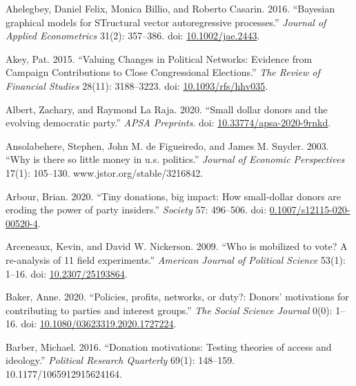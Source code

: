 \documentclass[12pt,]{article}
\newlength{\cslhangindent}
\newenvironment{CSLReferences}%
    {\setlength{\parindent}{0pt}%
    \everypar{\setlength{\hangindent}{\cslhangindent}}\ignorespaces}%
    {\par}
\begin{document}
\hypertarget{refs}{}
\begin{CSLReferences}{1}{0}
\leavevmode{}%
Ahelegbey, Daniel Felix, Monica Billio, and Roberto Casarin. 2016.
{``Bayesian graphical models for STructural vector autoregressive
processes.''} \emph{Journal of Applied Econometrics} 31(2): 357--386.
doi: \href{https://doi.org/10.1002/jae.2443}{10.1002/jae.2443}.

\leavevmode{}%
Akey, Pat. 2015. {``{Valuing Changes in Political Networks: Evidence
from Campaign Contributions to Close Congressional Elections}.''}
\emph{The Review of Financial Studies} 28(11): 3188--3223. doi:
\href{https://doi.org/10.1093/rfs/hhv035}{10.1093/rfs/hhv035}.

\leavevmode{}%
Albert, Zachary, and Raymond La Raja. 2020. {``Small dollar donors and
the evolving democratic party.''} \emph{APSA Preprints}. doi:
\href{https://doi.org/10.33774/apsa-2020-9rnkd}{10.33774/apsa-2020-9rnkd}.

\leavevmode{}%
Ansolabehere, Stephen, John M. de Figueiredo, and James M. Snyder. 2003.
{``Why is there so little money in u.s. politics.''} \emph{Journal of
Economic Perspectives} 17(1): 105--130. www.jstor.org/stable/3216842.

\leavevmode{}%
Arbour, Brian. 2020. {``Tiny donations, big impact: How small-dollar
donors are eroding the power of party insiders.''} \emph{Society} 57:
496--506. doi:
\href{https://doi.org/0.1007/s12115-020-00520-4}{0.1007/s12115-020-00520-4}.

\leavevmode{}%
Arceneaux, Kevin, and David W. Nickerson. 2009. {``Who is mobilized to
vote? A re-analysis of 11 field experiments.''} \emph{American Journal
of Political Science} 53(1): 1--16. doi:
\href{https://doi.org/10.2307/25193864}{10.2307/25193864}.

\leavevmode{}%
Baker, Anne. 2020. {``Policies, profits, networks, or duty?: Donors'
motivations for contributing to parties and interest groups.''}
\emph{The Social Science Journal} 0(0): 1--16. doi:
\href{https://doi.org/10.1080/03623319.2020.1727224}{10.1080/03623319.2020.1727224}.

\leavevmode{}%
Barber, Michael. 2016. {``Donation motivations: Testing theories of
access and ideology.''} \emph{Political Research Quarterly} 69(1):
148--159. 10.1177/1065912915624164.


\end{CSLReferences}
\end{document}
